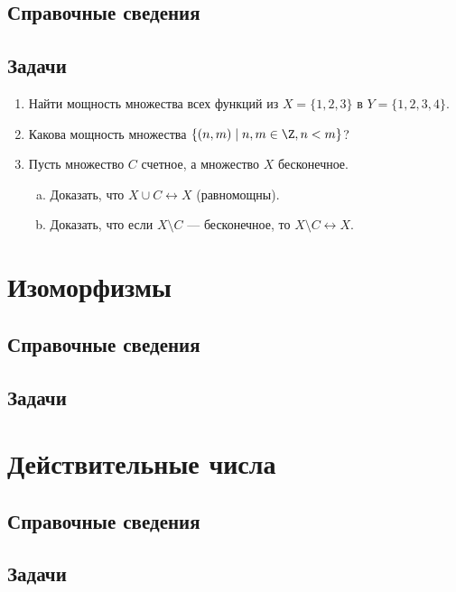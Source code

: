 \subsection*{Справочные сведения}

\subsection*{Задачи}

\begin{enumerate}
\item Найти мощность множества всех функций из $X=\{1,2,3\}$ в $Y=\{1,2,3,4\}$.
\item Какова мощность множества $\{(n,m)\mid n,m\in\Z, n<m\}$?
\item Пусть множество $C$ счетное, а множество $X$ бесконечное.
\begin{enumerate}[a)]
\item Доказать, что $X\cup C\leftrightarrow X$ (равномощны).
\item Доказать, что если $X\setminus C$ --- бесконечное, то $X\setminus C\leftrightarrow X$.
\end{enumerate}
\end{enumerate}

\section{Изоморфизмы}

\subsection*{Справочные сведения}

\subsection*{Задачи}


\section{Действительные числа}

\subsection*{Справочные сведения}

\subsection*{Задачи}

